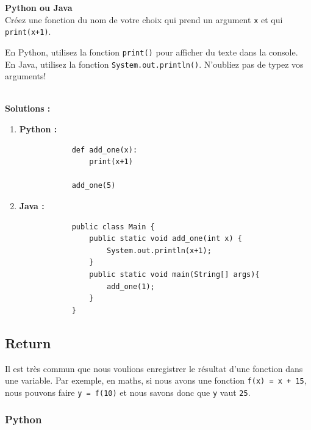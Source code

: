 \begin{Exercice}[5 minutes] \textbf{Python ou Java} \\
    Créez une fonction du nom de votre choix qui prend un argument \lstinline{x} et qui \lstinline{print(x+1)}.
        
    \begin{conseil}
        En Python, utilisez la fonction \lstinline{print()} pour afficher du texte dans la console. \\
        En Java, utilisez la fonction \lstinline{System.out.println()}. N'oubliez pas de typez vos arguments!
    \end{conseil}
    \\
    \textbf{Solutions :}
    \begin{enumerate}
        \item \textbf{Python :}
        \begin{verbatim}
            def add_one(x):
                print(x+1)
                
            add_one(5)
        \end{verbatim}
        \item \textbf{Java :}
        \begin{verbatim}
            public class Main {
                public static void add_one(int x) {
                    System.out.println(x+1); 
                }
                public static void main(String[] args){
                    add_one(1);
                }
            }
        \end{verbatim}
    \end{enumerate}
        

\end{Exercice}

\subsection{Return}
Il est très commun que nous voulions enregistrer le résultat d'une fonction dans une variable. Par exemple, en maths, si nous avons une fonction \lstinline{f(x) = x + 15}, nous pouvons faire \lstinline{y = f(10)} et nous savons donc que \lstinline{y} vaut \lstinline{25}. 

\subsubsection{Python}

